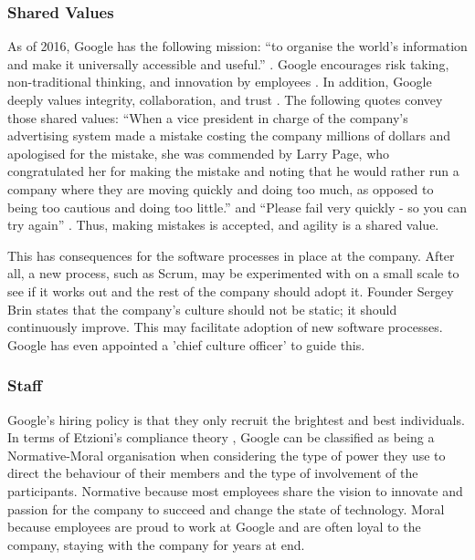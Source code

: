 \subsubsection{Shared Values}
As of 2016, Google has the following mission: ``to organise the world’s information and make it universally accessible and useful.'' \citep{About86:online}.
Google encourages risk taking, non-traditional thinking, and innovation by employees \citep{Decis25:online}.
In addition, Google deeply values integrity, collaboration, and trust \citep{striebeck2006ssh}.
The following quotes convey those shared values: ``When a vice president in charge of the company’s advertising system made a mistake costing the company millions of dollars and apologised for the mistake, she was commended by Larry Page, who congratulated her for making the mistake and noting that he would rather run a company where they are moving quickly and doing too much, as opposed to being too cautious and doing too little.'' and ``Please fail very quickly - so you can try again'' \citep{ORGAN15:online}.
Thus, making mistakes is accepted, and agility is a shared value.

This has consequences for the software processes in place at the company.
After all, a new process, such as Scrum, may be experimented with on a small scale to see if it works out and the rest of the company should adopt it.
Founder Sergey Brin states that the company's culture should not be static; it should continuously improve.
This may facilitate adoption of new software processes. Google has even appointed a 'chief culture officer' to guide this.

\subsubsection{Staff}
Google's hiring policy is that they only recruit the brightest and best individuals. In terms of Etzioni's compliance theory \citep{lunenburg2013compliance}, Google can be classified as being a Normative-Moral organisation when considering the type of power they use to direct the behaviour of their members and the type of involvement of the participants. Normative because most employees share the vision to innovate and passion for the company to succeed and change the state of technology. Moral because employees are proud to work at Google and are often loyal to the company, staying with the company for years at end.

